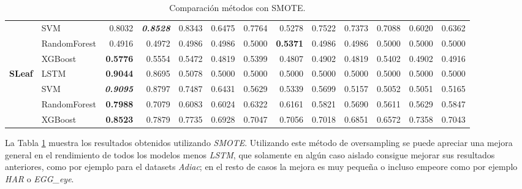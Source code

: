 \begin{table}[H]
\begin{adjustbox}{max width=12cm}
\begin{tabular}{|c|l|r|r|r|r|r|r|r|r|r|r|r|}
			                      & SVM          & 0.8032                   & \textit{\textbf{0.8528}} & 0.8343          & 0.6475 & 0.7764          & 0.5278                   & 0.7522                   & 0.7373                   & 0.7088 & 0.6020                   & 0.6362          \\
			                      & RandomForest & 0.4916                   & 0.4972                   & 0.4986          & 0.4986 & 0.5000          & \textbf{0.5371}          & 0.4986                   & 0.4986                   & 0.5000 & 0.5000                   & 0.5000          \\
			                      & XGBoost      & \textbf{0.5776}          & 0.5554                   & 0.5472          & 0.4819 & 0.5399          & 0.4807                   & 0.4902                   & 0.4819                   & 0.5402 & 0.4902                   & 0.4916          \\
			\hline
			\textbf{SLeaf}        & LSTM         & \textbf{0.9044}          & 0.8695                   & 0.5078          & 0.5000 & 0.5000          & 0.5000                   & 0.5000                   & 0.5000                   & 0.5000 & 0.5000                   & 0.5000          \\
			                      & SVM          & \textit{\textbf{0.9095}} & 0.8797                   & 0.7487          & 0.6431 & 0.5629          & 0.5339                   & 0.5699                   & 0.5157                   & 0.5052 & 0.5051                   & 0.5165          \\
			                      & RandomForest & \textbf{0.7988}          & 0.7079                   & 0.6083          & 0.6024 & 0.6322          & 0.6161                   & 0.5821                   & 0.5690                   & 0.5611 & 0.5629                   & 0.5847          \\
			                      & XGBoost      & \textbf{0.8523}          & 0.7879                   & 0.7735          & 0.6928 & 0.7047          & 0.7056                   & 0.7018                   & 0.6851                   & 0.6572 & 0.7358                   & 0.7043          \\
			\hline
		\end{tabular}
	\end{adjustbox}
	\caption{Comparación métodos con SMOTE.}
	\label{tab:all_comp_smote}
\end{table}

La Tabla \ref{tab:all_comp_smote} muestra los resultados obtenidos utilizando \textit{SMOTE}. Utilizando este método de oversampling se puede apreciar una mejora general en el rendimiento de todos los modelos menos \textit{LSTM}, que solamente en algún caso aislado consigue mejorar sus resultados anteriores, como por ejemplo para el datasets \textit{Adiac}; en el resto de casos la mejora es muy pequeña o incluso empeore como por ejemplo \textit{HAR} o \textit{EGG\_eye}.\newline
\newpage

